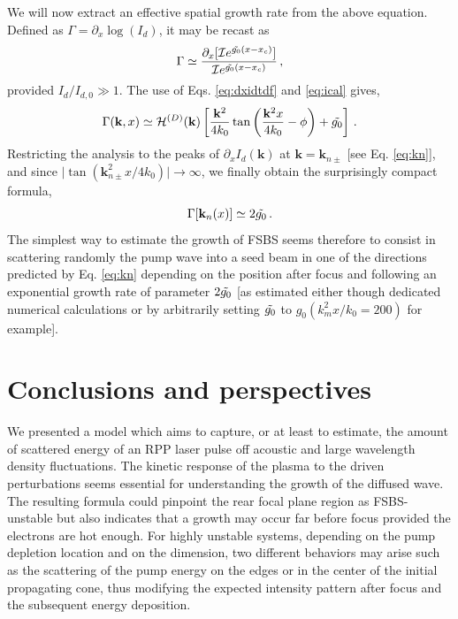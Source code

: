 \documentclass[
 reprint,
 amsmath,amssymb,
 aps,
]{revtex4-1}
\begin{document}
We will now extract an effective spatial growth rate from the above equation. Defined as $\Gamma = \partial_x \log(I_d)$,  it may be recast   as 
\begin{equation}
  \Gamma \simeq \frac{
  \partial_x [\mathcal{I}e^{\Tilde{g_0}(x-x_c)} ]
  }{
  \mathcal{I}e^{\Tilde{g_0}(x-x_c)} 
  }
  \, ,\label{eq:gdef}
\end{equation}
provided $I_d/I_{d,0}\gg1$.
The use of Eqs. \eqref{eq:dxidtdf} and \eqref{eq:ical}  gives,
\begin{equation}
  \Gamma(\mathbf{k},x) \simeq  \mathcal{H}^{(D)}(\mathbf{k}) \left[ 
  \frac{\mathbf{k}^2}{ 4k_0 } \tan\left(\frac{\mathbf{k}^2x}{4k_0}-\phi\right)
  +\Tilde{g_0}
  \right]
  \, .\label{eq:g1}
\end{equation}
Restricting the analysis to the peaks of $\partial_x I_d(\mathbf{k})$  at $\mathbf{k}=\mathbf{k}_{n\pm}$ [see Eq. \eqref{eq:kn}], and since $\vert \tan(\mathbf{k}_{n\pm}^2x/4k_0)\vert\rightarrow \infty$, we finally obtain the surprisingly compact formula,
\begin{equation}
  \Gamma[\mathbf{k}_n(x)] \simeq  2\Tilde{g_0}
  \, .\label{eq:gf}
\end{equation}
The simplest way to estimate the growth of FSBS seems  therefore to consist in scattering randomly the pump wave into a  seed beam in one of the directions predicted by Eq. \eqref{eq:kn}  depending  on the position after focus  and 
following an exponential growth rate of parameter $2\Tilde{g_0}$ [as estimated either though dedicated numerical calculations or by arbitrarily setting $\Tilde{g_0}$ to $g_0(k_m^2 x/k_0 =200 )$ for example].

\section{Conclusions and perspectives}
We presented a model which  aims to capture, or at least to estimate, the amount of scattered energy of an RPP laser pulse off acoustic and  large wavelength density fluctuations. The kinetic response of the plasma  to the driven perturbations  seems essential for understanding the growth of the diffused wave. 
The resulting formula could pinpoint the rear focal plane region as FSBS-unstable but also indicates that a growth may occur far before focus  provided the electrons are hot enough.  
For highly unstable systems, depending on the pump depletion location and on the dimension, two different behaviors may arise such as the scattering of the pump energy on the edges or in the center of the initial propagating cone, thus modifying  the expected intensity pattern after focus and the subsequent energy deposition.
\end{document}
